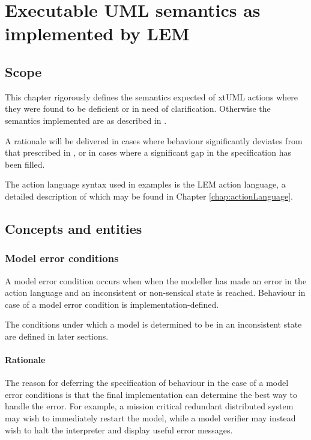%

\chapter{Executable UML semantics as implemented by LEM}

\section{Scope}

This chapter rigorously defines the semantics expected of xtUML actions where
they were found to be deficient or in need of clarification. Otherwise the
semantics implemented are as described in \cite{mellor:2002}.

A rationale will be delivered in cases where behaviour significantly deviates
from that prescribed in \cite{mellor:2002}, or in cases where a significant gap
in the specification has been filled.

The action language syntax used in examples is the LEM action language, a
detailed description of which may be found in Chapter \ref{chap:actionLanguage}.

\section{Concepts and entities}
\subsection{Model error conditions}
A model error condition occurs when when the modeller has made an error in
the action language and an inconsistent or non-sensical state is reached.
Behaviour in case of a model error condition is implementation-defined.

The conditions under which a model is determined to be in an inconsistent state
are defined in later sections.

\subsubsection{Rationale}
The reason for deferring the specification of behaviour in the case of a model
error conditions is that the final implementation can determine the best way to
handle the error. For example, a mission critical redundant distributed system
may wish to immediately restart the model, while a model verifier may instead
wish to halt the interpreter and display useful error messages.

